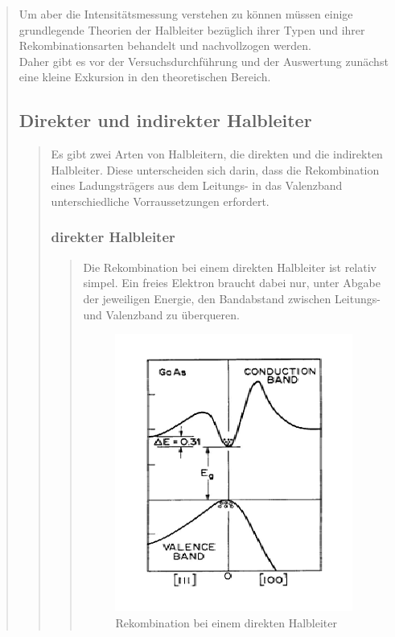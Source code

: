 \begin{quote}
    Um aber die Intensitätsmessung verstehen zu können müssen einige
    grundlegende Theorien der Halbleiter bezüglich ihrer Typen und ihrer
    Rekombinationsarten behandelt und nachvollzogen werden.\\
    Daher gibt es vor der Versuchsdurchführung und der Auswertung zunächst eine
    kleine Exkursion in den theoretischen Bereich.

        \subsection{Direkter und indirekter Halbleiter }
        \begin{quote}

        Es gibt zwei Arten von Halbleitern, die direkten und die indirekten
        Halbleiter. Diese unterscheiden sich darin, dass die Rekombination eines
        Ladungsträgers aus dem Leitungs- in das Valenzband unterschiedliche
        Vorraussetzungen erfordert.

            \subsubsection{direkter Halbleiter}
            \begin{quote}
            Die Rekombination bei einem direkten Halbleiter ist relativ simpel.
            Ein freies Elektron braucht dabei nur, unter Abgabe der jeweiligen
            Energie, den Bandabstand zwischen Leitungs- und Valenzband zu
            überqueren.

            \begin{figure}[H]
                    \centering
                        \includegraphics[scale=0.72, trim = 1cm 0cm 1.5cm 0cm,
                        clip]{./Emissionsbilder/restliches/direkt.png}
                        \caption{Rekombination bei einem direkten Halbleiter}
                            \label{fig:./Emissionsbilder/restliches/direkt.png}
            \end{figure}



\end{quote}
\end{quote}
\end{quote}
